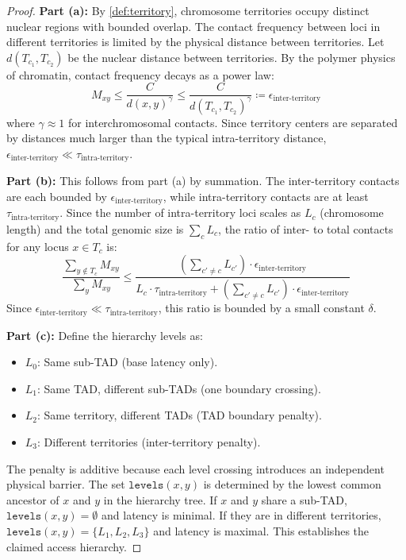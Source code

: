 \documentclass[12pt,a4paper]{article}
\theoremstyle{plain}
\theoremstyle{definition}
\begin{document}
\begin{proof}
\textbf{Part (a):} By \cref{def:territory}, chromosome territories occupy distinct nuclear regions with bounded overlap. The contact frequency between loci in different territories is limited by the physical distance between territories. Let $d(T_{c_1}, T_{c_2})$ be the nuclear distance between territories. By the polymer physics of chromatin, contact frequency decays as a power law:
\[
  M_{xy} \leq \frac{C}{d(x,y)^\gamma} \leq \frac{C}{d(T_{c_1}, T_{c_2})^\gamma} \coloneqq \epsilon_{\text{inter-territory}}
\]
where $\gamma \approx 1$ for interchromosomal contacts. Since territory centers are separated by distances much larger than the typical intra-territory distance, $\epsilon_{\text{inter-territory}} \ll \tau_{\text{intra-territory}}$.

\textbf{Part (b):} This follows from part (a) by summation. The inter-territory contacts are each bounded by $\epsilon_{\text{inter-territory}}$, while intra-territory contacts are at least $\tau_{\text{intra-territory}}$. Since the number of intra-territory loci scales as $L_c$ (chromosome length) and the total genomic size is $\sum_c L_c$, the ratio of inter- to total contacts for any locus $x \in T_c$ is:
\[
  \frac{\sum_{y \notin T_c} M_{xy}}{\sum_y M_{xy}} \leq \frac{(\sum_{c' \neq c} L_{c'}) \cdot \epsilon_{\text{inter-territory}}}{L_c \cdot \tau_{\text{intra-territory}} + (\sum_{c' \neq c} L_{c'}) \cdot \epsilon_{\text{inter-territory}}}
\]
Since $\epsilon_{\text{inter-territory}} \ll \tau_{\text{intra-territory}}$, this ratio is bounded by a small constant $\delta$.

\textbf{Part (c):} Define the hierarchy levels as:
\begin{itemize}
  \item $L_0$: Same sub-TAD (base latency only).
  \item $L_1$: Same TAD, different sub-TADs (one boundary crossing).
  \item $L_2$: Same territory, different TADs (TAD boundary penalty).
  \item $L_3$: Different territories (inter-territory penalty).
\end{itemize}
The penalty is additive because each level crossing introduces an independent physical barrier. The set $\texttt{levels}(x,y)$ is determined by the lowest common ancestor of $x$ and $y$ in the hierarchy tree. If $x$ and $y$ share a sub-TAD, $\texttt{levels}(x,y) = \emptyset$ and latency is minimal. If they are in different territories, $\texttt{levels}(x,y) = \{L_1, L_2, L_3\}$ and latency is maximal. This establishes the claimed access hierarchy.
\end{proof}
\end{document}
